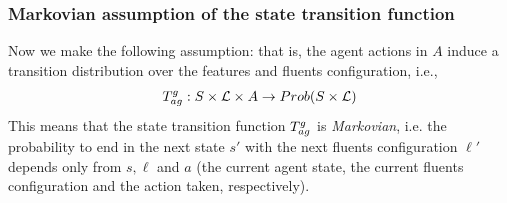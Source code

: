 %
\subsubsection{Markovian assumption of the state transition function}
Now we make the following assumption: that is, the agent actions in $A$ induce a transition distribution over the features and
fluents configuration, i.e.,
\begin{equation}\label{joint-tr-fun}
T_{ag}^{g} : S\times \mathcal{L} \times A \rightarrow Prob(S\times \mathcal{L})
\end{equation}
This means that the state transition function $T_{ag}^{g}$ is \emph{Markovian}, i.e. the probability to end in the next state $s'$ with the next fluents configuration $\ell'$ depends only from $s, \ell$ and $a$ (the current agent state, the current fluents configuration and the action taken, respectively).



